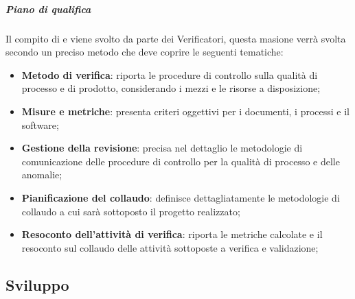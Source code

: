 \subparagraph{Piano di qualifica}
Il compito di  e  viene svolto da parte dei Verificatori, questa masione verrà svolta secondo un preciso metodo che deve coprire le seguenti tematiche:
\begin{itemize}
	\item\textbf{{Metodo di verifica}}: riporta le procedure di controllo sulla qualità di processo e di prodotto, considerando i mezzi e le risorse a disposizione; 	
	\item\textbf{{Misure e metriche}}: presenta criteri oggettivi per i documenti, i processi e il software; 	
	\item\textbf{{Gestione della revisione}}: precisa nel dettaglio le metodologie di comunicazione delle procedure di controllo per la qualità di processo e delle anomalie; 	
	\item\textbf{{Pianificazione del collaudo}}: definisce dettagliatamente le metodologie di collaudo a cui sarà sottoposto il progetto realizzato; 	
	\item\textbf{{Resoconto dell'attività di verifica}}: riporta le metriche calcolate e il resoconto sul collaudo delle attività sottoposte a verifica e validazione; 			
\end{itemize}
\subsection{Sviluppo}
\pagebreak